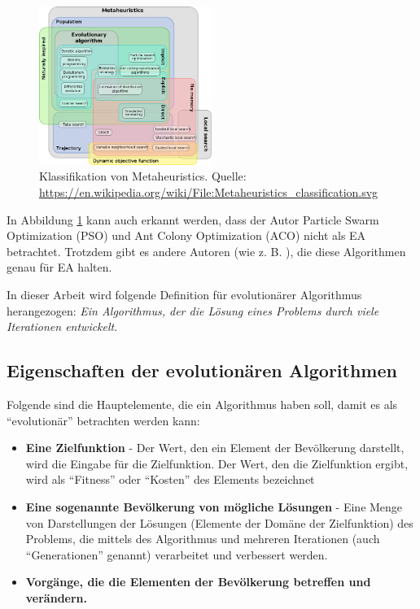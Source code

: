 \documentclass[twoside,twocolumn]{article}
\begin{document}
\begin{figure}
\caption{Klassifikation von Metaheuristics. Quelle: \url{https://en.wikipedia.org/wiki/File:Metaheuristics_classification.svg}}
\label{fig:metaheuristics}
\centering
\includegraphics[width=0.5\textwidth]{images/metaheuristics_classification.png}
\end{figure}

In Abbildung \ref{fig:metaheuristics} kann auch erkannt werden, dass der Autor Particle Swarm Optimization (PSO) und Ant Colony Optimization (ACO) nicht als EA betrachtet. Trotzdem gibt es andere Autoren (wie z. B. \cite{wiley_evolutionary}), die diese Algorithmen genau für EA halten.\par

In dieser Arbeit wird folgende Definition für evolutionärer Algorithmus herangezogen: \textit{Ein Algorithmus, der die Lösung eines Problems durch viele Iterationen entwickelt}.

\subsection{Eigenschaften der evolutionären Algorithmen}
Folgende sind die Hauptelemente, die ein Algorithmus haben soll, damit es als \enquote{evolutionär} betrachten werden kann:

\begin{itemize}
\item{\textbf{Eine Zielfunktion} - Der Wert, den ein Element der Bevölkerung darstellt, wird die Eingabe für die Zielfunktion. Der Wert, den die Zielfunktion ergibt, wird als \enquote{Fitness} oder \enquote{Kosten} des Elements bezeichnet}
\item{\textbf{Eine sogenannte Bevölkerung von mögliche Lösungen} - Eine Menge von Darstellungen der Lösungen (Elemente der Domäne der Zielfunktion) des Problems, die mittels des Algorithmus und mehreren Iterationen (auch \enquote{Generationen} genannt) verarbeitet und verbessert werden.}
\item{\textbf{Vorgänge, die die Elementen der Bevölkerung betreffen und verändern.}}
\end{itemize}
\end{document}
